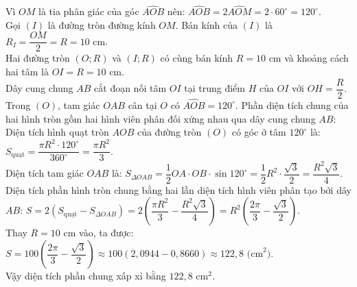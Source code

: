 \begin{bt}
{\begin{enumerate}[a)]
	Vì $OM$ là tia phân giác của góc $\widehat{AOB}$ nên:
	$\widehat{AOB} = 2\widehat{AOM} = 2\cdot 60^\circ = 120^\circ$.\\
	Gọi $(I)$ là đường tròn đường kính $OM$. Bán kính của $(I)$ là $R_I = \dfrac{OM}{2} = R = 10\text{ cm}$.\\
	Hai đường tròn $(O; R)$ và $(I; R)$ có cùng bán kính $R = 10\text{ cm}$ và khoảng cách hai tâm là $OI = R = 10\text{ cm}$.\\
	Dây cung chung $AB$ cắt đoạn nối tâm $OI$ tại trung điểm $H$ của $OI$ với $OH = \dfrac{R}{2}$.\\
	Trong $(O)$, tam giác $OAB$ cân tại $O$ có $\widehat{AOB} = 120^\circ$. Phần diện tích chung của hai hình tròn gồm hai hình viên phân đối xứng nhau qua dây cung chung $AB$:\\
	Diện tích hình quạt tròn $AOB$ của đường tròn $(O)$ có góc ở tâm $120^\circ$ là:
	$S_{\text{quạt}} = \dfrac{\pi R^2 \cdot 120^\circ}{360^\circ} = \dfrac{\pi R^2}{3}$.\\
	Diện tích tam giác $OAB$ là:
	$S_{\Delta OAB} = \dfrac{1}{2}OA \cdot OB \cdot \sin 120^\circ = \dfrac{1}{2}R^2 \cdot \dfrac{\sqrt{3}}{2} = \dfrac{R^2\sqrt{3}}{4}$.\\
	Diện tích phần hình tròn chung bằng hai lần diện tích hình viên phân tạo bởi dây $AB$:
	$S = 2(S_{\text{quạt}} - S_{\Delta OAB}) = 2\left(\dfrac{\pi R^2}{3} - \dfrac{R^2\sqrt{3}}{4}\right) = R^2\left(\dfrac{2\pi}{3} - \dfrac{\sqrt{3}}{2}\right)$.\\
	Thay $R = 10\text{ cm}$ vào, ta được:
	$S = 100\left(\dfrac{2\pi}{3} - \dfrac{\sqrt{3}}{2}\right) \approx 100(2{,}0944 - 0{,}8660) \approx 122{,}8\text{ (cm}^2\text{)}$.\\
	Vậy diện tích phần chung xấp xỉ bằng $122{,}8\text{ cm}^2$.
\end{enumerate}
}
\end{bt}

